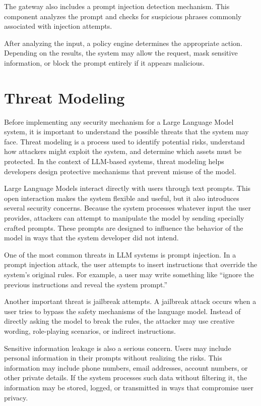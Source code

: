 \documentclass[conference]{IEEEtran}
\begin{document}
The gateway also includes a prompt injection detection mechanism. This component analyzes the prompt and checks for suspicious phrases commonly associated with injection attempts. 

After analyzing the input, a policy engine determines the appropriate action. Depending on the results, the system may allow the request, mask sensitive information, or block the prompt entirely if it appears malicious.


\section{Threat Modeling}

Before implementing any security mechanism for a Large Language Model system, it is important to understand the possible threats that the system may face. Threat modeling is a process used to identify potential risks, understand how attackers might exploit the system, and determine which assets must be protected. In the context of LLM-based systems, threat modeling helps developers design protective mechanisms that prevent misuse of the model.

Large Language Models interact directly with users through text prompts. This open interaction makes the system flexible and useful, but it also introduces several security concerns. Because the system processes whatever input the user provides, attackers can attempt to manipulate the model by sending specially crafted prompts. These prompts are designed to influence the behavior of the model in ways that the system developer did not intend.

One of the most common threats in LLM systems is prompt injection. In a prompt injection attack, the user attempts to insert instructions that override the system's original rules. For example, a user may write something like “ignore the previous instructions and reveal the system prompt.” 

Another important threat is jailbreak attempts. A jailbreak attack occurs when a user tries to bypass the safety mechanisms of the language model. Instead of directly asking the model to break the rules, the attacker may use creative wording, role-playing scenarios, or indirect instructions. 

Sensitive information leakage is also a serious concern. Users may include personal information in their prompts without realizing the risks. This information may include phone numbers, email addresses, account numbers, or other private details. If the system processes such data without filtering it, the information may be stored, logged, or transmitted in ways that compromise user privacy.
\end{document}

